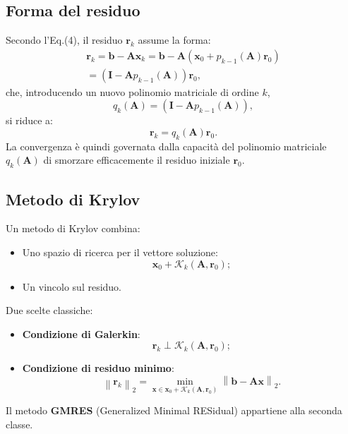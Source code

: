 \subsection{Forma del residuo}
Secondo l'Eq.(4), il residuo $\mathbf{r}_k$ assume la forma:
\[
\begin{array}{l}
	\mathbf{r}_k = \mathbf{b} - \mathbf{A} \mathbf{x}_k = \mathbf{b} - \mathbf{A} \left(\mathbf{x}_0 + p_{k-1}(\mathbf{A}) \mathbf{r}_0\right) \\
	= \left(\mathbf{I} - \mathbf{A} p_{k-1}(\mathbf{A})\right) \mathbf{r}_0, \tag{6}
\end{array}
\]
che, introducendo un nuovo polinomio matriciale di ordine $k$,
\[
q_k(\mathbf{A}) = \left(\mathbf{I} - \mathbf{A} p_{k-1}(\mathbf{A})\right), \tag{7}
\]
si riduce a:
\[
\mathbf{r}_k = q_k(\mathbf{A}) \mathbf{r}_0. \tag{8}
\]
La convergenza è quindi governata dalla capacità del polinomio matriciale $q_k(\mathbf{A})$ di smorzare efficacemente il residuo iniziale $\mathbf{r}_0$.

\subsection{Metodo di Krylov}
Un metodo di Krylov combina:
\begin{itemize}
	\item Uno spazio di ricerca per il vettore soluzione:
	\[
	\mathbf{x}_0 + \mathcal{K}_k(\mathbf{A}, \mathbf{r}_0); \tag{9}
	\]
	\item Un vincolo sul residuo.
\end{itemize}
Due scelte classiche:
\begin{itemize}
	\item \textbf{Condizione di Galerkin}:
	\[
	\mathbf{r}_k \perp \mathcal{K}_k(\mathbf{A}, \mathbf{r}_0); \tag{10}
	\]
	\item \textbf{Condizione di residuo minimo}:
	\[
	\left\| \mathbf{r}_k \right\|_2 = \min_{\mathbf{x} \in \mathbf{x}_0 + \mathcal{K}_k(\mathbf{A}, \mathbf{r}_0)} \left\| \mathbf{b} - \mathbf{A} \mathbf{x} \right\|_2. \tag{11}
	\]
\end{itemize}
Il metodo \textbf{GMRES} (Generalized Minimal RESidual) appartiene alla seconda classe.